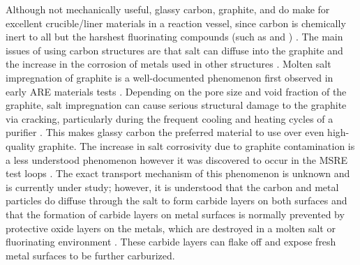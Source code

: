 Although not mechanically useful, glassy carbon, graphite, and 
do make for excellent crucible/liner materials in a reaction vessel,
since carbon is chemically inert to all but the harshest fluorinating
compounds (such as  and ) \cite{rev31,rev61}. The main
issues of using carbon structures are that salt can diffuse into the
graphite \cite{rev62} and the increase in the corrosion of metals used
in other structures \cite{rev63,rev64}. Molten salt impregnation of
graphite is a well-documented phenomenon first observed in early ARE
materials tests \cite{rev61,rev65}. Depending on the pore size and void
fraction of the graphite, salt impregnation can cause serious structural
damage to the graphite via cracking, particularly during the frequent
cooling and heating cycles of a purifier \cite{rev62}. This makes glassy
carbon the preferred material to use over even high-quality graphite.
The increase in salt corrosivity due to graphite contamination is a
less understood phenomenon however it was discovered to occur in the MSRE
test loops \cite{rev63}. The exact transport mechanism of this phenomenon
is unknown and is currently under study; however, it is understood that
the carbon and metal particles do diffuse through the salt to form
carbide layers on both surfaces and that the formation of carbide
layers on metal surfaces is normally prevented by protective oxide layers
on the metals, which are destroyed in a molten salt or fluorinating
environment \cite{rev64}. These carbide layers can flake off and expose
fresh metal surfaces to be further carburized. \par
